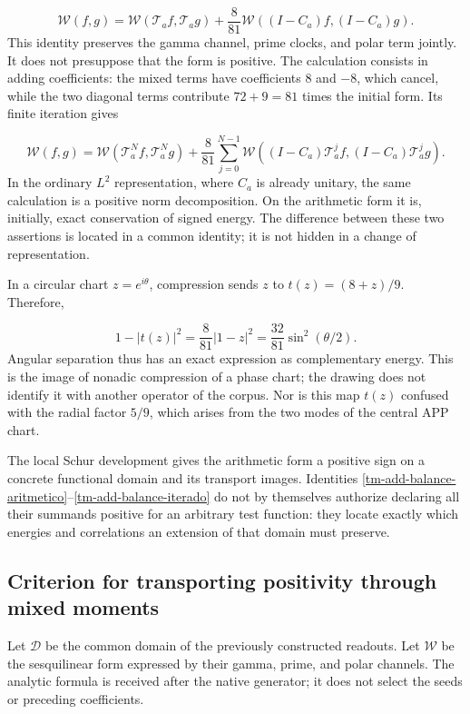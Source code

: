 \begin{equation}
\boxed{\mathscr W(f,g)=\mathscr W(\mathcal T_af,\mathcal T_ag)
+\frac8{81}\mathscr W((I-C_a)f,(I-C_a)g).}
\label{tm-add-balance-aritmetico}
\end{equation}
This identity preserves the gamma channel, prime clocks, and polar term jointly. It does not presuppose that the form is positive. The calculation consists in adding coefficients: the mixed terms have coefficients \(8\) and \(-8\), which cancel, while the two diagonal terms contribute \(72+9=81\) times the initial form. Its finite iteration gives

\begin{equation}
\mathscr W(f,g)=\mathscr W(\mathcal T_a^Nf,\mathcal T_a^Ng)
+\frac8{81}\sum_{j=0}^{N-1}
\mathscr W((I-C_a)\mathcal T_a^jf,(I-C_a)\mathcal T_a^jg).
\label{tm-add-balance-iterado}
\end{equation}
In the ordinary \(L^2\) representation, where \(C_a\) is already unitary, the same calculation is a positive norm decomposition. On the arithmetic form it is, initially, exact conservation of signed energy. The difference between these two assertions is located in a common identity; it is not hidden in a change of representation.

In a circular chart \(z=e^{i\theta}\), compression sends \(z\) to \(t(z)=(8+z)/9\). Therefore,

\[
1-|t(z)|^2=\frac8{81}|1-z|^2
=\frac{32}{81}\sin^2(\theta/2).
\]
Angular separation thus has an exact expression as complementary energy. This is the image of nonadic compression of a phase chart; the drawing does not identify it with another operator of the corpus. Nor is this map \(t(z)\) confused with the radial factor \(5/9\), which arises from the two modes of the central APP chart.



The local Schur development gives the arithmetic form a positive sign on a concrete functional domain and its transport images. Identities \eqref{tm-add-balance-aritmetico}–\eqref{tm-add-balance-iterado} do not by themselves authorize declaring all their summands positive for an arbitrary test function: they locate exactly which energies and correlations an extension of that domain must preserve.


\subsection{Criterion for transporting positivity through mixed moments}
\label{tm-add-c5}
Let \(\mathcal D\) be the common domain of the previously constructed readouts. Let \(\mathscr W\) be the sesquilinear form expressed by their gamma, prime, and polar channels. The analytic formula is received after the native generator; it does not select the seeds or preceding coefficients.

